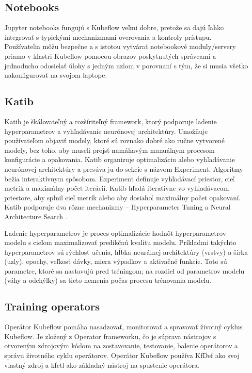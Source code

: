 \subsection*{Notebooks}

Jupyter notebooks fungujú s Kubeflow veľmi dobre, pretože sa dajú ľahko integrovať s typickými mechanizmami overovania a kontroly prístupu. Používatelia môžu bezpečne a s istotou vytvárať notebookové moduly/servery priamo v klastri Kubeflow pomocou obrazov poskytnutých správcami a jednoducho odosielať úlohy s jedným uzlom v porovnaní s tým, že si musia všetko nakonfigurovať na svojom laptope.


\subsection*{Katib}

Katib je škálovateľný a rozšíriteľný framework, ktorý podporuje ladenie hyperparametrov a vyhľadávanie neurónovej architektúry. Umožňuje používateľom objaviť modely, ktoré sú rovnako dobré ako ručne vytvorené modely, bez toho, aby museli prejsť namáhavým manuálnym procesom konfigurácie a opakovania. Katib organizuje optimalizáciu alebo vyhľadávanie neurónovej architektúry a presúva ju do sekcie s názvom Experiment. Algoritmy bežia interaktívnym spôsobom. Experiment definuje vyhľadávací priestor, cieľ metrík a maximálny počet iterácií. Katib hľadá iteratívne vo vyhľadávacom priestore, aby splnil cieľ metrík alebo aby dosiahol maximálny počet opakovaní. Katib podporuje dva rôzne mechanizmy – Hyperparameter Tuning a Neural Architecture Search \cite{katib}.

Ladenie hyperparametrov je proces optimalizácie hodnôt hyperparametrov modelu s cieľom maximalizovať predikčnú kvalitu modelu. Príkladmi takýchto hyperparametrov sú rýchlosť učenia, hĺbka neurálnej architektúry (vrstvy) a šírka (uzly), epochy, veľkosť dávky, miera výpadkov a aktivačné funkcie. Toto sú parametre, ktoré sa nastavujú pred tréningom; na rozdiel od parametrov modelu (váhy a odchýlky) sa tieto nemenia počas procesu trénovania modelu.

\subsection*{Training operators}

Operátor Kubeflow pomáha nasadzovať, monitorovať a spravovať životný cyklus Kubeflow. Je zložený z Operator frameworku, čo je súprava nástrojov s otvoreným zdrojovým kódom na zostavovanie, testovanie, balenie operátorov a správu životného cyklu operátorov. Operátor Kubeflow používa KfDef ako svoj vlastný zdroj a kfctl ako základný nástroj na spustenie operátora.

